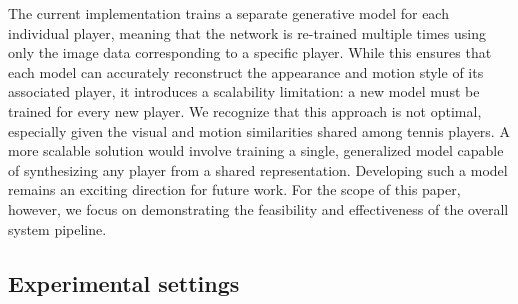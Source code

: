 \documentclass[manuscript, screen]{acmart}
\begin{document}




The current implementation trains a separate generative model for each individual player, meaning that the network is re-trained multiple times using only the image data corresponding to a specific player. 
While this ensures that each model can accurately reconstruct the appearance and motion style of its associated player, it introduces a scalability limitation: a new model must be trained for every new player.
We recognize that this approach is not optimal, especially given the visual and motion similarities shared among tennis players. 
A more scalable solution would involve training a single, generalized model capable of synthesizing any player from a shared representation. 
Developing such a model remains an exciting direction for future work. 
For the scope of this paper, however, we focus on demonstrating the feasibility and effectiveness of the overall system pipeline.


\subsection{Experimental settings}
\end{document}
